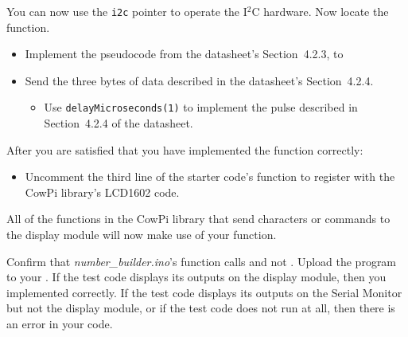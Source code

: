 You can now use the \lstinline{i2c} pointer to operate the I$^2$C hardware.
Now locate the  function.

\begin{itemize}
    \item Implement the pseudocode from the datasheet's Section~4.2.3, to
    \item Send the three bytes of data described in the datasheet's Section~4.2.4.
        \begin{itemize}
            \item Use \lstinline{delayMicroseconds(1)} to implement the pulse described in Section~4.2.4 of the datasheet.
        \end{itemize}
\end{itemize}

After you are satisfied that you have implemented the  function correctly:

\begin{itemize}
    \item Uncomment the third line of the starter code's  function to register  with the CowPi library's LCD1602 code.
\end{itemize}

All of the functions in the CowPi library that send characters or commands to the display module will now make use of your  function.

Confirm that \textit{number\_builder.ino}'s  function calls  and not .
Upload the program to your \developmentboard.
If the test code displays its outputs on the display module, then you implemented  correctly. If the test code displays its outputs on the Serial Monitor but not the display module, or if the test code does not run at all, then there is an error in your code.